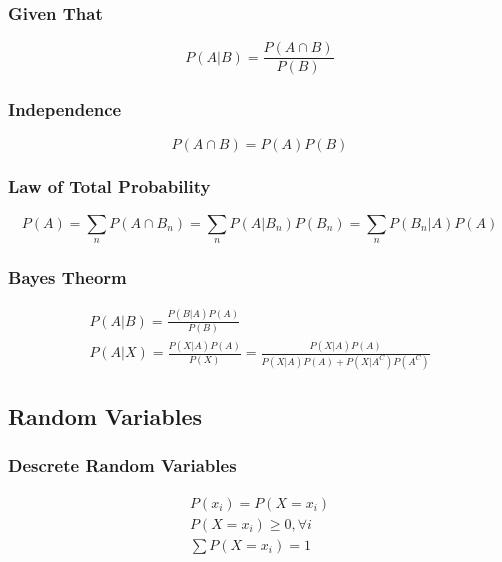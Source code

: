 \documentclass{article}
\begin{document}
    \subsubsection{Given That}
    \begin{equation}
        P(A | B) = \frac {P(A \cap B)} {P(B)}
    \end{equation}

    \subsubsection{Independence}
    \begin{equation}
        P(A \cap B) = P(A)P(B)
    \end{equation}

    \subsubsection{Law of Total Probability}
    \begin{equation}
        P(A) = \sum_n P(A \cap B_n) = \sum_n P(A | B_n)P(B_n) = \sum_n P(B_n | A)P(A)
    \end{equation}

    \subsubsection{Bayes Theorm}
    \begin{gather}
        P(A | B) = \frac {P(B | A)P(A)} { P(B) } \\
        P(A | X) = \frac {P(X |A )P(A)} { P(X) } = \frac {P(X |A )P(A)} { P(X | A)P(A) + P(X | A^C)P(A^C) }
    \end{gather}

    \subsection{Random Variables}

    \subsubsection{Descrete Random Variables}
    \begin{equation}
    \begin{split}
        P(x_i) = P(X = x_i) \\
        P(X=x_i) \geq 0, \forall i \\
        \sum P(X=x_i) = 1
    \end{split}
    \end{equation}
\end{document}

